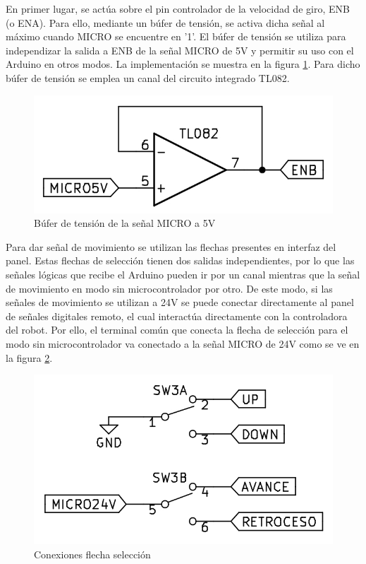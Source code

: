 En primer lugar, se actúa sobre el pin controlador de la velocidad de giro, ENB (o ENA). Para ello, mediante
un búfer de tensión, se activa dicha señal al máximo cuando MICRO se encuentre en '1'. El búfer de tensión
se utiliza para independizar la salida a ENB de la señal MICRO de 5V y permitir su uso con el Arduino en otros modos.
La implementación se muestra en la figura \ref{fig:buferenb}. Para dicho búfer de tensión se emplea un canal
del circuito integrado TL082.

\begin{figure}[hbtp]
    \centering
    \includegraphics[scale=1.25]{03-placa/buferenb.jpg}
    \caption{Búfer de tensión de la señal MICRO a 5V}
    \label{fig:buferenb}
    \end{figure}

Para dar señal de movimiento se utilizan las flechas presentes en interfaz del panel. Estas flechas de selección tienen dos salidas independientes, por lo que las señales lógicas que recibe el Arduino pueden ir por un canal mientras que la señal de movimiento en modo sin microcontrolador por otro. De este modo, si las señales de movimiento se utilizan a 24V se puede conectar directamente al panel de señales digitales remoto, el cual interactúa directamente con la controladora del robot. Por ello, el terminal común que conecta la flecha de selección para el modo sin microcontrolador va conectado a la señal MICRO de 24V como se ve en la figura \ref{fig:flecha}.

\begin{figure}[hbtp]
    \centering
    \includegraphics[scale=1.25]{03-placa/flecha.jpg}
    \caption{Conexiones flecha selección}
    \label{fig:flecha}
    \end{figure}

